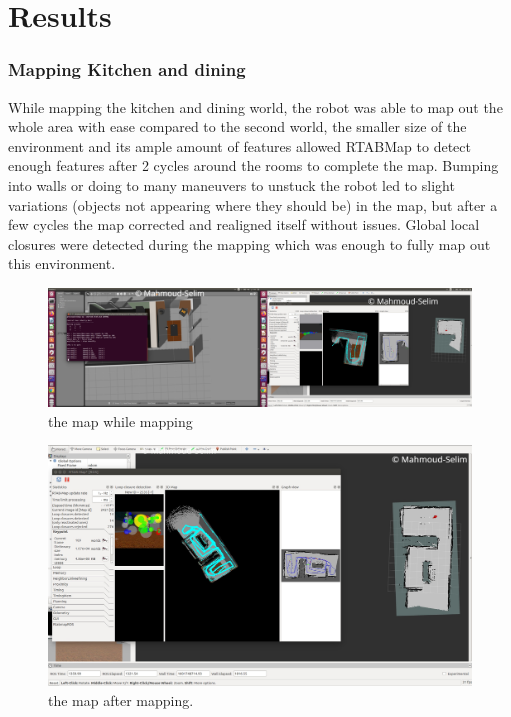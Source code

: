\documentclass[10pt,journal,compsoc]{IEEEtran}
\begin{document}
\section {Results}
\subsubsection {Mapping Kitchen and dining}
While mapping the kitchen and dining world, the robot
was able to map out the whole area with ease compared to
the second world, the smaller size of the environment and
its ample amount of features allowed RTABMap to detect
enough features after 2 cycles around the rooms to complete
the map. Bumping into walls or doing to many maneuvers
to unstuck the robot led to slight variations (objects not
appearing where they should be) in the map, but after a
few cycles the map corrected and realigned itself without
issues.
Global local closures were detected
during the mapping which was enough to fully map out
this environment.
\begin{figure}[thpb]
      \centering
      \includegraphics[width=\linewidth]{provided_world_partial_map}
      \caption{the map while mapping}
\end{figure}

\begin{figure}[thpb]
      \centering
      \includegraphics[width=\linewidth]{provided_world_full_map}
      \caption{the map after mapping.}
\end{figure}
\end{document}
